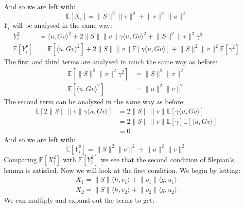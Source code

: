 And so we are left with:
\begin{equation*}
    \mathds{E}\left[X_i\right] = \lVert S \rVert^2 \lVert v \rVert^2 +  \lVert v \rVert^2\lVert u \rVert^2
\end{equation*}
$Y_i$ will be analysed in the same way:
\begin{align*}
    Y_i^2 &= \langle u, Gv \rangle^2 + 2\lVert S \rVert\lVert v \rVert\gamma\langle u, Gv \rangle^2 + \lVert S \rVert^2\lVert v \rVert^2\gamma^2 \\
    \mathds{E}\left[Y_i^2\right] &= \mathds{E}\left[\langle u, Gv\rangle^2\right] + 2\lVert S \rVert\lVert v \rVert\mathds{E}\left[\gamma \langle u, Gv\rangle\right] + \lVert S \rVert^2\lVert v \rVert^2\mathds{E}\left[\gamma^2\right]
\end{align*}
The first and third terms are analysed in much the same way as before:
\begin{align*}
    \mathds{E}\left[ \lVert S \rVert^2 \lVert v \rVert^2 \gamma^2\right] &= \lVert S \rVert^2 \lVert v \rVert^2 \\
    \mathds{E}\left[ \langle u, Gv\rangle^2\right] &= \lVert u \rVert^2 \lVert v \rVert^2
\end{align*}
The second term can be analyzed in the same way as before:
\begin{align*}
    \mathds{E}\left[2\lVert S \rVert\lVert v \rVert\gamma \langle u, Gv\rangle\right] &= 2\lVert S \rVert\lVert v \rVert\mathds{E}\left[\gamma \langle u, Gv\rangle\right] \\
                                                                                      &= 2\lVert S \rVert\lVert v \rVert\mathds{E}\left[\gamma\right]\mathds{E}\left[\langle u, Gv\rangle\right] \\
                                                                                      &= 0
\end{align*}
And so we are left with:
\begin{equation*}
    \mathds{E}\left[Y_i^2\right] = \lVert S \rVert^2 \lVert v \rVert^2 + \lVert u \rVert^2 \lVert v \rVert^2
\end{equation*}
Comparing $\mathds{E}\left[X_i^2\right]$ with $\mathds{E}\left[Y_i^2\right]$ we see that the second condition of
Slepian's lemma is satisfied. Now we will look at the first condition. We begin by letting:
\begin{align*}
    X_1 = \lVert S \rVert \langle h, v_1 \rangle + \lVert v_1 \rVert \langle g, u_1 \rangle \\
    X_2 = \lVert S \rVert \langle h, v_2 \rangle + \lVert v_2 \rVert \langle g, u_2 \rangle
\end{align*} 
We can multiply and expand out the terms to get:


